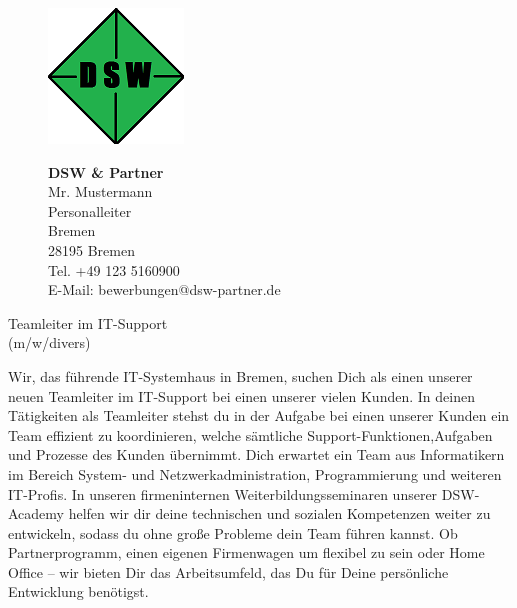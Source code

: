 \documentclass[12pt,utf8]{scrartcl}
\begin{document}
\begin{flushleft}
\newpage
{}
\begin{figure}[htbp]
	\begin{minipage}[t]{4cm}
		\vspace{0pt}
		\centering
		\includegraphics{images/Logo}
		\label{fig:Logo}
	\end{minipage}
	\hfill
	\begin{minipage}[t]{4cm}
		\vspace{0pt}
		\scriptsize
		\textbf{DSW \& Partner}\\
		Mr. Mustermann\\
		Personalleiter\\
		Bremen\\
		28195 Bremen\\
		Tel. +49 123 5160900 \\
		E-Mail: bewerbungen@dsw-partner.de
	\end{minipage}
\end{figure}

\large
\begin{center} Teamleiter im IT-Support\\(m/w/divers)\end{center} 

\scriptsize
Wir, das führende IT-Systemhaus in Bremen, suchen Dich als einen unserer neuen Teamleiter im IT-Support bei einen unserer vielen Kunden. In deinen Tätigkeiten als Teamleiter stehst du in der Aufgabe bei einen unserer Kunden ein Team effizient zu koordinieren, welche sämtliche Support-Funktionen,Aufgaben und Prozesse des Kunden übernimmt. Dich erwartet ein Team aus Informatikern im Bereich System- und Netzwerkadministration, Programmierung und weiteren IT-Profis. In unseren firmeninternen Weiterbildungsseminaren unserer DSW-Academy helfen wir dir deine technischen und sozialen Kompetenzen weiter zu entwickeln, sodass du ohne große Probleme dein Team führen kannst. Ob Partnerprogramm, einen eigenen Firmenwagen um flexibel zu sein oder Home Office – wir bieten Dir das Arbeitsumfeld, das Du für Deine persönliche Entwicklung benötigst.



\end{flushleft}
\end{document}
